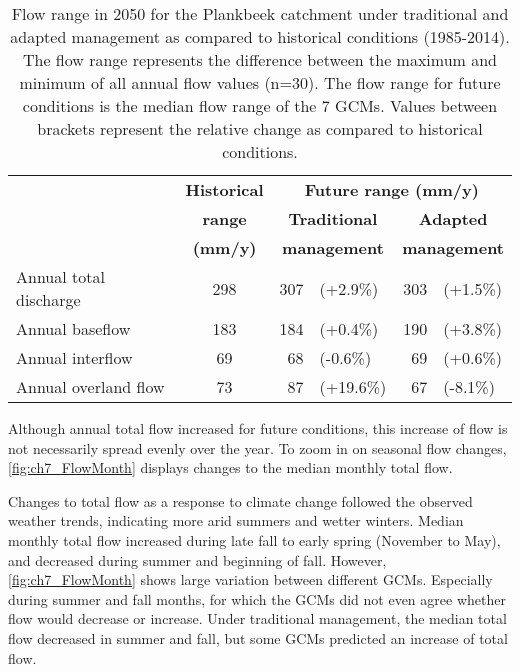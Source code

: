 \begin{table}[htbp]
  \centering
  	\caption{Flow range in 2050 for the Plankbeek catchment under traditional and adapted management as compared to historical conditions (1985-2014). The flow range represents the difference between the maximum and minimum of all annual flow values (n=30). The flow range for future conditions is the median flow range of the 7 GCMs. Values between brackets represent the relative change as compared to historical conditions.}
\begin{tabular}{rcrlrl}
\toprule
 & \textbf{Historical} & \multicolumn{4}{c}{\textbf{Future range (\si{mm/y})}} \\
      & \textbf{range} & \multicolumn{2}{c}{\textbf{Traditional}} & \multicolumn{2}{c}{\textbf{Adapted}} \\
   & \textbf{(\si{mm/y})}&  \multicolumn{2}{c}{\textbf{management}} & \multicolumn{2}{c}{\textbf{management}} \\
\midrule
\multicolumn{1}{l}{Annual total discharge} & 298   & 307   & (+2.9\%) & 303   & (+1.5\%) \\
\multicolumn{1}{l}{Annual baseflow} & 183   & 184   & (+0.4\%) & 190   & (+3.8\%) \\
\multicolumn{1}{l}{Annual interflow} & 69    & 68    & (-0.6\%) & 69    & (+0.6\%) \\
\multicolumn{1}{l}{Annual overland flow} & 73    & 87    & (+19.6\%) & 67    & (-8.1\%) \\
\bottomrule
\end{tabular}%
  \label{tab:ch7_FlowRange}
  \end{table}


Although annual total flow increased for future conditions, this increase of flow is not necessarily spread evenly over the year. To zoom in on seasonal flow changes, \autoref{fig:ch7_FlowMonth} displays changes to the median monthly total flow. 

Changes to total flow as a response to climate change followed the observed weather trends, indicating more arid summers and wetter winters. Median monthly total flow increased during late fall to early spring (November to May), and decreased during summer and beginning of fall. However, \autoref{fig:ch7_FlowMonth} shows large variation between different GCMs. Especially during summer and fall months, for which the GCMs did not even agree whether flow would decrease or increase. Under traditional management,  the median total flow decreased in summer and fall, but some GCMs predicted an increase of total flow. 

